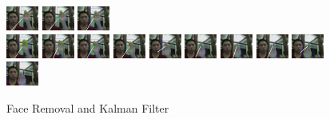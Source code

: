 \documentclass[12pt]{article}
\begin{document}
\begin{figure}[H]
\includegraphics[width=40px, height=30px]{../data/nofacekalman/img0037.jpg}
\includegraphics[width=40px, height=30px]{../data/nofacekalman/img0038.jpg}
\includegraphics[width=40px, height=30px]{../data/nofacekalman/img0039.jpg} \\
\includegraphics[width=40px, height=30px]{../data/nofacekalman/img0040.jpg}
\includegraphics[width=40px, height=30px]{../data/nofacekalman/img0041.jpg}
\includegraphics[width=40px, height=30px]{../data/nofacekalman/img0042.jpg}
\includegraphics[width=40px, height=30px]{../data/nofacekalman/img0043.jpg}
\includegraphics[width=40px, height=30px]{../data/nofacekalman/img0044.jpg}
\includegraphics[width=40px, height=30px]{../data/nofacekalman/img0045.jpg}
\includegraphics[width=40px, height=30px]{../data/nofacekalman/img0046.jpg}
\includegraphics[width=40px, height=30px]{../data/nofacekalman/img0047.jpg}
\includegraphics[width=40px, height=30px]{../data/nofacekalman/img0048.jpg}
\includegraphics[width=40px, height=30px]{../data/nofacekalman/img0049.jpg}
\label{seq-nofacekalman}
\caption{Face Removal and Kalman Filter}
\end{figure}
\end{document}
